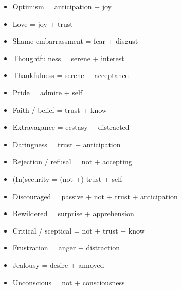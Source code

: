 \documentclass[a5,landscape]{article}
\begin{document}
{\footnotesize
{} 
\begin{multicols}{4}
\begin{itemize}
\item   Optimism = anticipation + joy 

\item   Love = joy + trust 

\item   Shame embarrassment = fear + disgust 

\item   Thoughtfulness = serene + interest 

\item   Thankfulness = serene + acceptance 

\item   Pride = admire + self 

\item   Faith / belief = trust + know 

\item   Extravagance = ecstasy + distracted 

\item   Daringness = trust + anticipation 

\item   Rejection / refusal = not + accepting 

\item   (In)security = (not +) trust + self  

\item   Discouraged = passive + not + trust + anticipation 

\item   Bewildered = surprise + apprehension 

\item   Critical / sceptical = not + trust + know  

\item   Frustration = anger + distraction  

\item   Jealousy = desire + annoyed 

\end{itemize}
\end{multicols}

\begin{multicols}{4}
\begin{itemize}
\item   Unconscious = not + consciousness 


\end{itemize}
\end{multicols}}
\end{document}
